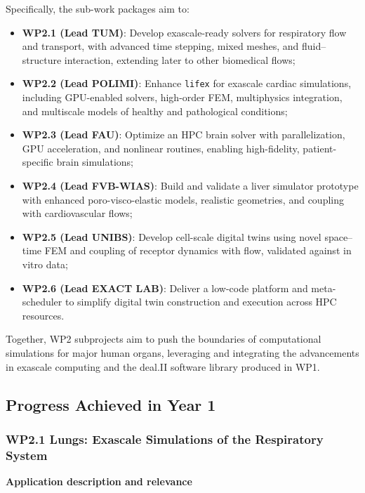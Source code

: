 \documentclass[a4paper,12pt, numbers]{article}
\begin{document}
Specifically, the sub-work packages aim to:
\begin{itemize}
\item \textbf{WP2.1 (Lead TUM)}: Develop exascale-ready solvers for respiratory flow and transport, with advanced time
stepping, mixed meshes, and fluid–structure interaction, extending later to other biomedical flows;
\item \textbf{WP2.2 (Lead POLIMI)}: Enhance \texttt{lifex} for exascale cardiac simulations, including GPU-enabled solvers, high-order FEM, multiphysics integration, and multiscale models of healthy and pathological conditions;
\item \textbf{WP2.3 (Lead FAU)}: Optimize an HPC brain solver with parallelization, GPU acceleration, and nonlinear routines, enabling high-fidelity, patient-specific brain simulations;
\item \textbf{WP2.4 (Lead FVB-WIAS)}: Build and validate a liver simulator prototype with enhanced poro-visco-elastic models, realistic geometries, and coupling with cardiovascular flows;
\item \textbf{WP2.5 (Lead UNIBS)}: Develop cell-scale digital twins using novel space–time FEM and coupling of receptor dynamics with flow, validated against in vitro data;
\item \textbf{WP2.6 (Lead EXACT LAB)}: Deliver a low-code platform and meta-scheduler to simplify digital twin construction and execution across HPC resources.
\end{itemize}

Together, WP2 subprojects aim to push the boundaries of computational simulations for major human organs, leveraging and integrating the advancements in exascale computing and the deal.II software library produced in WP1.

\subsection{Progress Achieved in Year 1}

\subsubsection*{WP2.1 Lungs: Exascale Simulations of the Respiratory System}

\noindent\textbf{Application description and relevance}
\end{document}
